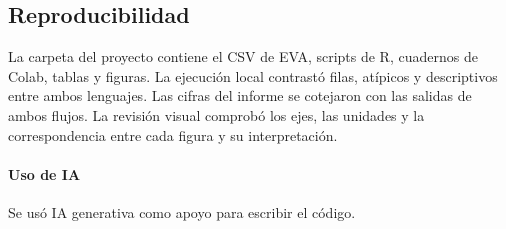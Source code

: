 \documentclass[11pt,a4paper]{article}
\begin{document}
\subsection*{Reproducibilidad}
La carpeta del proyecto contiene el CSV de EVA, scripts de R, cuadernos de Colab, tablas y
figuras. La ejecución local contrastó filas, atípicos y descriptivos entre ambos lenguajes. Las cifras del informe se cotejaron con las salidas de ambos flujos.
La revisión visual comprobó los ejes, las unidades y la correspondencia entre cada figura
y su interpretación.

\paragraph{Uso de IA}
Se usó IA generativa como apoyo para escribir el código.
\end{document}
